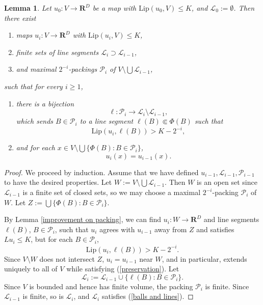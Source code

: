 \documentclass[reqno,11pt]{amsart}
\newcommand{\RR}{\mathbf{R}}
\newcommand{\Lip}{\mathrm{Lip}}
\newtheorem{lemma}[theorem]{Lemma}
\theoremstyle{definition}
\numberwithin{equation}{section}
\begin{document}
\begin{lemma}\label{iterating the packing}
Let $u_0: V \to \RR^D$ be a map with $\Lip(u_0, V) \leq K$, and $\mathscr L_0 := \emptyset$.
Then there exist
\begin{enumerate}
\item maps $u_i: V \to \RR^D$ with $\Lip(u_i, V) \leq K$,
\item finite sets of line segments $\mathscr L_i \supset \mathscr L_{i - 1}$,
\item and maximal $2^{-i}$-packings $\mathscr P_i$ of $V \setminus \bigcup \mathscr L_{i - 1}$,
\end{enumerate}
such that for every $i \geq 1$,
\begin{enumerate}
\item \label{balls and lines} there is a bijection
$$\ell: \mathscr P_i \to \mathscr L_i \setminus \mathscr L_{i - 1},$$
which sends $B \in \mathscr P_i$ to a line segment $\ell(B) \Subset \Phi(B)$ such that
$$\Lip(u_i, \ell(B)) > K - 2^{-i},$$
\item \label{preservation} and for each $x \in V \setminus \bigcup \{\Phi(B): B \in \mathscr P_i\}$,
$$u_i(x) = u_{i - 1}(x).$$
\end{enumerate}
\end{lemma}
\begin{proof}
We proceed by induction. Assume that we have defined $u_{i - 1}, \mathscr L_{i - 1}, \mathscr P_{i - 1}$ to have the desired properties.
Let $W := V \setminus \bigcup \mathscr L_{i - 1}$.
Then $W$ is an open set since $\mathscr L_{i - 1}$ is a finite set of closed sets, so we may choose a maximal $2^{-i}$-packing $\mathscr P_i$ of $W$.
Let $Z := \bigcup \{\Phi(B): B \in \mathscr P_i\}$.

By Lemma \ref{improvement on packing}, we can find $u_i: W \to \RR^D$ and line segments $\ell(B)$, $B \in \mathscr P_i$, such that $u_i$ agrees with $u_{i - 1}$ away from $Z$ and satisfies $Lu_i \leq K$, but for each $B \in \mathscr P_i$,
$$\Lip(u_i, \ell(B)) > K - 2^{-i}.$$
Since $V \setminus W$ does not intersect $Z$, $u_i = u_{i - 1}$ near $W$, and in particular, extends uniquely to all of $V$ while satisfying (\ref{preservation}).
Let
$$\mathscr L_i := \mathscr L_{i - 1} \cup \{\ell(B): B \in \mathscr P_i\}.$$
Since $V$ is bounded and hence has finite volume, the packing $\mathscr P_i$ is finite.
Since $\mathscr L_{i - 1}$ is finite, so is $\mathscr L_i$, and $\mathscr L_i$ satisfies (\ref{balls and lines}).
\end{proof}
\end{document}
